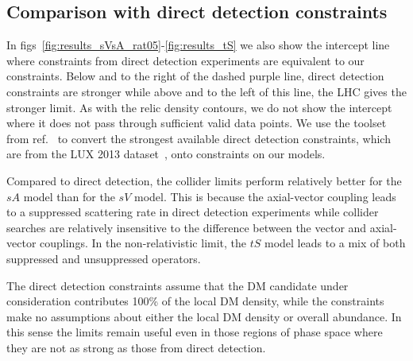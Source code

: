 \subsection{Comparison with direct detection constraints}

In figs~\ref{fig:results_sVsA_rat05}-\ref{fig:results_tS} we also show the intercept line where constraints from direct detection experiments are equivalent to our \monoX constraints. Below and to the right of the dashed purple line, direct detection constraints are stronger while above and to the left of this line, the LHC gives the stronger limit. As with the relic density contours, we do not show the intercept where it does not pass through sufficient valid data points. We use the toolset from ref.~\cite{DelNobile:2013sia} to convert the strongest available direct detection constraints, which are from the LUX 2013 dataset~\cite{Akerib:2013tjd}, onto constraints on our models.

Compared to direct detection, the \monoX collider limits perform relatively better for the $sA$ model than for the $sV$ model. This is because the axial-vector coupling leads to a suppressed scattering rate in direct detection experiments while collider searches are relatively insensitive to the difference between the vector and axial-vector couplings. In the non-relativistic limit, the $tS$ model leads to a mix of both suppressed and unsuppressed operators.

The direct detection constraints assume that the DM candidate under consideration contributes 100\% of the local DM density, while the \monoX constraints make no assumptions about either the local DM density or overall abundance. In this sense the \monoX limits remain useful even in those regions of phase space where they are not as strong as those from direct detection.
